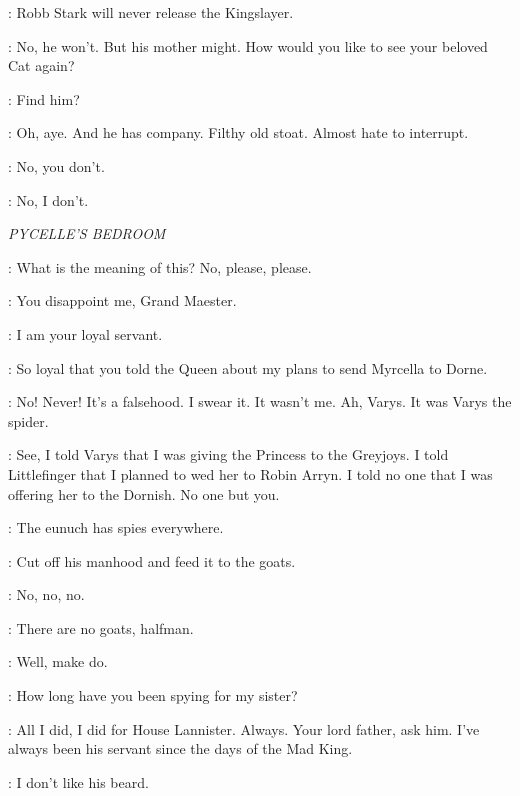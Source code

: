 \LITTLEFINGER: Robb Stark will never release the Kingslayer. 

\TYRION: No, he won't. But his mother might. How would you like to see your beloved Cat again? 


\TYRION: Find him? 

\BRONN: Oh, aye. And he has company. Filthy old stoat. Almost hate to interrupt. 

\TYRION: No, you don't. 

\BRONN: No, I don't. 



\scene

\textit{PYCELLE'S BEDROOM}


\PYCELLE: What is the meaning of this? No, please, please. 

\TYRION: You disappoint me, Grand Maester. 

\PYCELLE: I am your loyal servant. 

\TYRION: So loyal that you told the Queen about my plans to send Myrcella to Dorne. 

\PYCELLE: No! Never! It's a falsehood. I swear it. It wasn't me. Ah, Varys. It was Varys the spider. 

\TYRION: See, I told Varys that I was giving the Princess to the Greyjoys. I told Littlefinger that I planned to wed her to Robin Arryn. I told no one that I was offering her to the Dornish. No one but you. 

\PYCELLE: The eunuch has spies everywhere. 

\TYRION: Cut off his manhood and feed it to the goats. 

\PYCELLE: No, no, no. 

\TIMETT: There are no goats, halfman. 

\TYRION: Well, make do. 


\TYRION: How long have you been spying for my sister? 

\PYCELLE: All I did, I did for House Lannister. Always. Your lord father, ask him. I've always been his servant since the days of the Mad King. 

\TYRION: I don't like his beard. 

